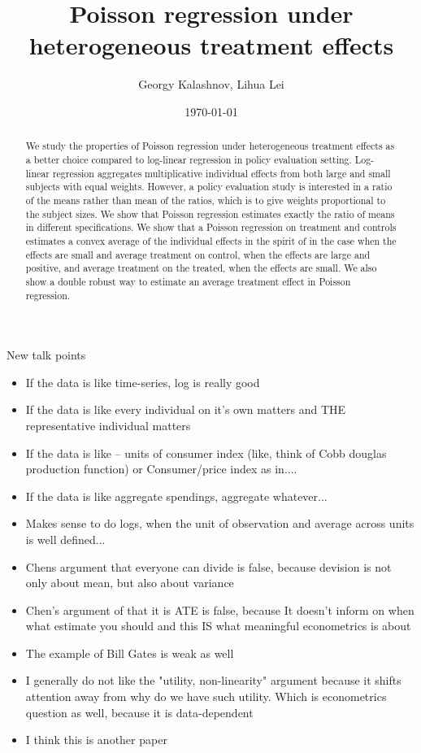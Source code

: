 \documentclass[a4paper,12pt]{article}
\title{Poisson regression under heterogeneous treatment effects}
\date{\today}
\author{Georgy Kalashnov, Lihua Lei}
\theoremstyle{plain}
\begin{document}
\maketitle


\begin{abstract}
We study the properties of Poisson regression under heterogeneous treatment effects as a better choice compared to log-linear regression in policy evaluation setting. Log-linear regression aggregates multiplicative individual effects from both large and small subjects with equal weights. However, a policy evaluation study is interested in a ratio of the means rather than mean of the ratios, which is to give weights proportional to the subject sizes. We show that Poisson regression estimates exactly the ratio of means in different specifications. We show that a Poisson regression on treatment and controls estimates a convex average of the individual effects in the spirit of \cite{angrist1998} in the case when the effects are small and average treatment on control, when the effects are large and positive, and average treatment on the treated, when the effects are small. We also show a double robust way to estimate an average treatment effect in Poisson regression.
\end{abstract}


New talk points
\begin{itemize}
    \item If the data is like time-series, log is really good
    \item If the data is like every individual on it's own matters and THE representative individual matters
    \item If the data is like -- units of consumer index (like, think of Cobb douglas production function) or Consumer/price index as in....
    \item If the data is like aggregate spendings, aggregate whatever...
    \item Makes sense to do logs, when the unit of observation and average across units is well defined...
    \item Chens argument that everyone can divide is false, because devision is not only about mean, but also about variance
    \item Chen's argument of that it is ATE is false, because It doesn't inform on when what estimate you should and this IS what meaningful econometrics is about
    \item The example of Bill Gates is weak as well
    \item I generally do not like the "utility, non-linearity" argument because it shifts attention away from why do we have such utility. Which is econometrics question as well, because it is data-dependent
    \item I think this is another paper
\end{itemize}
\end{document}
